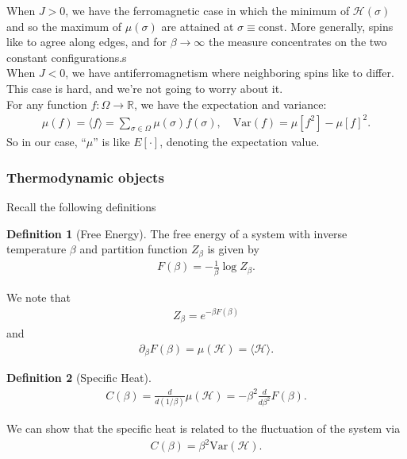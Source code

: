 \documentclass{book}
\theoremstyle{definition}
\newtheorem{defn}{Definition}[section]
\newcommand{\p}{\partial}
\newcommand{\had}{\mathcal{H}}
\newcommand{\f}[2]{\frac{#1}{#2}}
\begin{document}
When $J> 0$, we have the ferromagnetic case in which the minimum of $\had(\sigma)$ and so the maximum of $\mu(\sigma)$ are attained at $\sigma \equiv \text{const}$. More generally, spins like to agree along edges, and for $\beta \to \infty$ the measure concentrates on the two constant configurations.s \\

When $J < 0$, we have antiferromagnetism where neighboring spins like to differ. This case is hard, and we're not going to worry about it. \\

For any function $f: \Omega \to \mathbb{R}$, we have the expectation and variance:
\begin{align}
\mu(f) = \langle f \rangle = \sum_{\sigma\in \Omega} \mu(\sigma) f(\sigma), \quad \text{Var}(f) = \mu[f^2] - \mu[f]^2.
\end{align}
So in our case, ``$\mu$'' is like $E[\cdot]$, denoting the expectation value. 


\subsubsection{Thermodynamic objects}

Recall the following definitions
\begin{defn}[Free Energy]
	The free energy of a system with inverse temperature $\beta$ and partition function $Z_\beta$ is given by
	\begin{align}
	F(\beta) = -\f{1}{\beta}\log Z_\beta.
	\end{align}
\end{defn}

We note that 
\begin{align}
Z_\beta = e^{-\beta F(\beta)}
\end{align}
and
\begin{align}
\p_\beta F(\beta) = \mu(\had) = \langle \had \rangle.
\end{align}

\begin{defn}[Specific Heat]
	\begin{align}
	C(\beta) = \f{d}{d(1/\beta)} \mu(\had) = -\beta^2 \f{d}{d\beta^2}F(\beta).
	\end{align}
\end{defn}
We can show that the specific heat is related to the fluctuation of the system via
\begin{align}
C(\beta) = \beta^2 \text{Var}(\had).
\end{align}
\end{document}
